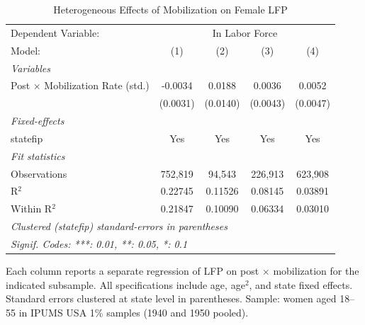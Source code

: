 
\begin{table}[htbp]
   \caption{\label{tab:het} Heterogeneous Effects of Mobilization on Female LFP}
   \centering
   \begin{tabular}{lcccc}
      \tabularnewline \midrule \midrule
      Dependent Variable: & \multicolumn{4}{c}{In Labor Force}\\
      Model:                                  & (1)      & (2)      & (3)      & (4)\\  
      \midrule
      \emph{Variables}\\
      Post $\times$ Mobilization Rate (std.)  & -0.0034  & 0.0188   & 0.0036   & 0.0052\\   
                                              & (0.0031) & (0.0140) & (0.0043) & (0.0047)\\   
      \midrule
      \emph{Fixed-effects}\\
      statefip                                & Yes      & Yes      & Yes      & Yes\\  
      \midrule
      \emph{Fit statistics}\\
      Observations                            & 752,819  & 94,543   & 226,913  & 623,908\\  
      R$^2$                                   & 0.22745  & 0.11526  & 0.08145  & 0.03891\\  
      Within R$^2$                            & 0.21847  & 0.10090  & 0.06334  & 0.03010\\  
      \midrule \midrule
      \multicolumn{5}{l}{\emph{Clustered (statefip) standard-errors in parentheses}}\\
      \multicolumn{5}{l}{\emph{Signif. Codes: ***: 0.01, **: 0.05, *: 0.1}}\\
   \end{tabular}
   
   \par \raggedright 
   Each column reports a separate regression of LFP on post $\times$ mobilization for the indicated subsample. All specifications include age, age$^2$, and state fixed effects. Standard errors clustered at state level in parentheses. Sample: women aged 18--55 in IPUMS USA 1\% samples (1940 and 1950 pooled).
\end{table}


